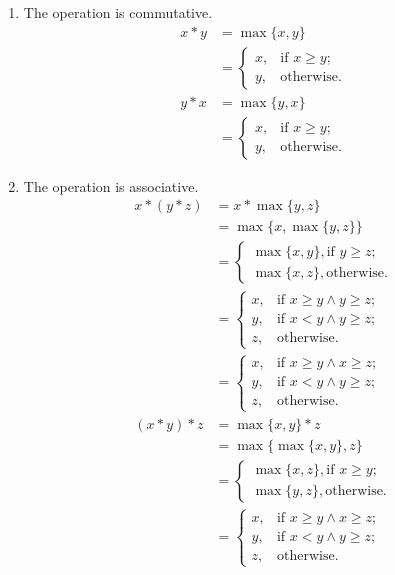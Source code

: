 \documentclass[twoside]{amsart}
\begin{document}
\begin{enumerate}[label=\protect{\textbf{\arabic*}}, leftmargin=1em]
\begin{enumerate}
  \item The operation is commutative. 
%
    \begin{align*}
         x * y & = \max\{x,y\}    \\
	       & =
	       \begin{cases}
	          x,       & \text{if $x \ge y$;} \\
		  y,       & \text{otherwise.}
	       \end{cases} \\
	 y * x & = \max\{y,x\}   \\
	       & =
	       \begin{cases}
                 x,       & \text{if $x \ge y$;} \\
                 y, & \text{otherwise.}
	       \end{cases}
    \end{align*}

  \item The operation is associative. 
    \begin{align*}
         x * (y * z) & = x * \max\{y,z\} \\
	             &= \max\{x, \max\{y,z\}\} \\
		     &=
		     \begin{cases}
		        \max\{x, y\}, \text{if $y \ge z$;} \\
			\max\{x, z\}, \text{otherwise.}
		     \end{cases} \\
		     & =
		     \begin{cases}
		        x,  & \text{if $x \ge y \land y \ge z$;} \\
			y,  & \text{if $x < y \land y \ge z$;}   \\
			z,  & \text{otherwise.}
		     \end{cases} \\
                     & =
		     \begin{cases}
		        x,  & \text{if $x \ge y \land x \ge z$;} \\
			y,  & \text{if $x < y \land y \ge z$;}   \\
			z,  & \text{otherwise.}
		     \end{cases} \\
	 (x * y) * z & = \max\{x,y\} * z \\
	             & = \max\{\max\{x,y\}, z\} \\
		     & =
		     \begin{cases}
		        \max\{x,z\}, \text{if $x \ge y$;} \\
			\max\{y,z\}, \text{otherwise.}
		     \end{cases} \\
		     & =
		     \begin{cases}
		        x, & \text{if $x \ge y \land x \ge z$;} \\
			y, & \text{if $x < y \land y \ge z$;} \\
			z, & \text{otherwise.}
		     \end{cases}
  \end{align*}


\end{enumerate}
\end{enumerate}
\end{document}
